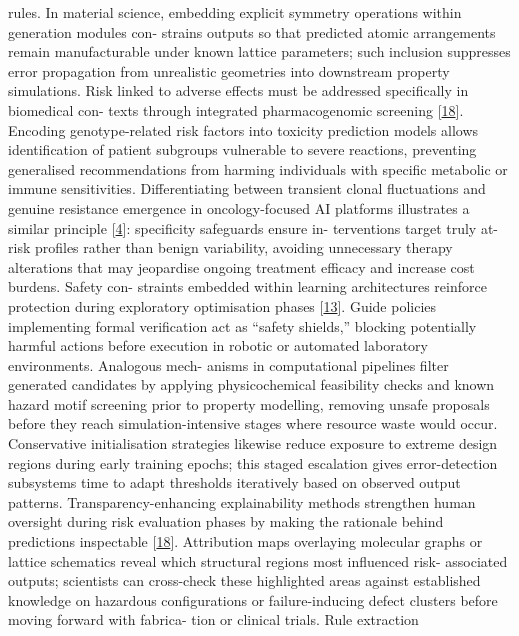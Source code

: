 \documentclass[
]{article}
\begin{document}
rules. In material science, embedding explicit symmetry operations
within generation modules con- strains outputs so that predicted atomic
arrangements remain manufacturable under known lattice parameters; such
inclusion suppresses error propagation from unrealistic geometries into
downstream property simulations. Risk linked to adverse effects must be
addressed specifically in biomedical con- texts through integrated
pharmacogenomic screening {[}\protect\hyperlink{_bookmark58}{18}{]}.
Encoding genotype-related risk factors into toxicity prediction models
allows identification of patient subgroups vulnerable to severe
reactions, preventing generalised recommendations from harming
individuals with specific metabolic or immune sensitivities.
Differentiating between transient clonal fluctuations and genuine
resistance emergence in oncology-focused AI platforms illustrates a
similar principle {[}\protect\hyperlink{_bookmark44}{4}{]}: specificity
safeguards ensure in- terventions target truly at-risk profiles rather
than benign variability, avoiding unnecessary therapy alterations that
may jeopardise ongoing treatment efficacy and increase cost burdens.
Safety con- straints embedded within learning architectures reinforce
protection during exploratory optimisation phases
{[}\protect\hyperlink{_bookmark53}{13}{]}. Guide policies implementing
formal verification act as ``safety shields,'' blocking potentially
harmful actions before execution in robotic or automated laboratory
environments. Analogous mech- anisms in computational pipelines filter
generated candidates by applying physicochemical feasibility checks and
known hazard motif screening prior to property modelling, removing
unsafe proposals before they reach simulation-intensive stages where
resource waste would occur. Conservative initialisation strategies
likewise reduce exposure to extreme design regions during early training
epochs; this staged escalation gives error-detection subsystems time to
adapt thresholds iteratively based on observed output patterns.
Transparency-enhancing explainability methods strengthen human oversight
during risk evaluation phases by making the rationale behind predictions
inspectable {[}\protect\hyperlink{_bookmark58}{18}{]}. Attribution maps
overlaying molecular graphs or lattice schematics reveal which
structural regions most influenced risk- associated outputs; scientists
can cross-check these highlighted areas against established knowledge on
hazardous configurations or failure-inducing defect clusters before
moving forward with fabrica- tion or clinical trials. Rule extraction
\end{document}
